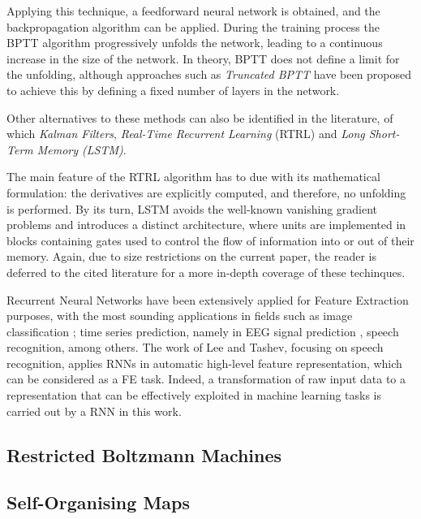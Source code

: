 \documentclass[9pt,journal,compsoc]{IEEEtran}
\begin{document}
Applying this technique, a feedforward neural network is obtained, and the backpropagation algorithm can be applied. During the training process the BPTT algorithm progressively unfolds the network, leading to a continuous increase in the size of the network. In theory, BPTT does not define a limit for the unfolding, although approaches such as \emph{Truncated BPTT} have been proposed to achieve this by defining a fixed number of layers in the network.

Other alternatives to these methods can also be identified in the literature, of which \emph{Kalman Filters}\cite{kalman1960new}, \emph{Real-Time Recurrent Learning} (RTRL)\cite{williams1989learning} and \emph{Long Short-Term Memory (LSTM)}\cite{hochreiter1997long}.

The main feature of the RTRL algorithm has to due with its mathematical formulation: the derivatives are explicitly computed, and therefore, no unfolding is performed. By its turn, LSTM avoids the well-known vanishing gradient problems and introduces a distinct architecture, where units are implemented in blocks containing gates used to control the flow of information into or out of their memory. Again, due to size restrictions on the current paper, the reader is deferred to the cited literature for a more in-depth coverage of these techinques.

Recurrent Neural Networks have been extensively applied for Feature Extraction purposes, with the most sounding applications in fields such as image classification \cite{graves2009offline}; time series prediction, namely in EEG signal prediction \cite{prasad2014deep}, speech recognition\cite{lee2015high}, among others. The work of Lee and Tashev\cite{lee2015high}, focusing on speech recognition, applies RNNs in automatic high-level feature representation, which can be considered as a FE task. Indeed, a transformation of raw input data to a representation that can be effectively exploited in machine learning tasks is carried out by a RNN in this work.

\subsection{Restricted Boltzmann Machines}



\subsection{Self-Organising Maps}
\end{document}
